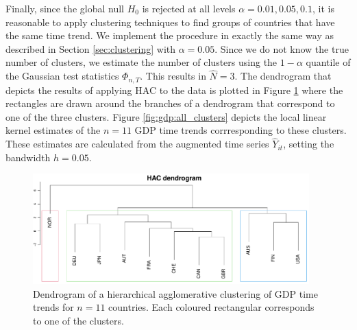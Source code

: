 \documentclass[a4paper,12pt]{article}
\begin{document}
Finally, since the global null $H_0$ is rejected at all levels $\alpha = 0.01, 0.05, 0.1$, it is reasonable to apply clustering techniques to find groups of countries that have the same time trend. We implement the procedure in exactly the same way as described in Section \ref{sec:clustering} with $\alpha = 0.05$. Since we do not know the true number of clusters, we estimate the number of clusters using the $1- \alpha$ quantile of the Gaussian test statistics $\Phi_{n, T}$. This results in $\widehat{N} = 3$. The dendrogram that depicts the results of applying HAC to the data is plotted in Figure \ref{fig:gdp:dend} where the rectangles are drawn around the branches of a dendrogram that correspond to one of the three clusters. Figure \ref{fig:gdp:all_clusters} depicts the local linear kernel estimates of the $n=11$ GDP time trends corrresponding to these clusters. These estimates are calculated from the augmented time series $\widehat{Y}_{it}$, setting the bandwidth $h = 0.05$.

\begin{figure}[t!]
\begin{center}
\includegraphics[width=0.95\textwidth]{output/plots/gdp/gdp_dendrogram}
\caption{Dendrogram of a hierarchical agglomerative clustering of GDP time trends for $n = 11$ countries.  Each coloured rectangular corresponds to one of the clusters.}\label{fig:gdp:dend}
\end{center}
\end{figure}
\end{document}
